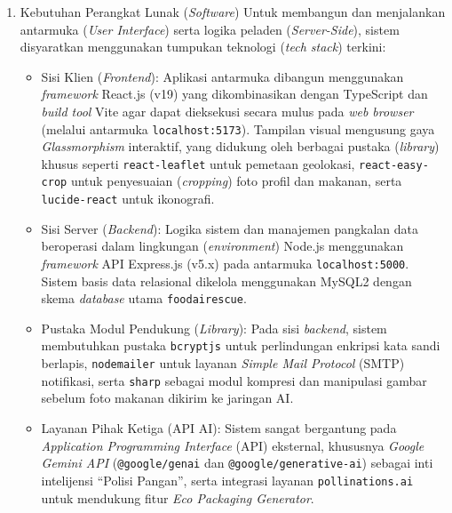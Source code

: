 \begin{enumerate}
    \item Kebutuhan Perangkat Lunak (\textit{Software})
    Untuk membangun dan menjalankan antarmuka (\textit{User Interface}) serta logika peladen (\textit{Server-Side}), sistem disyaratkan menggunakan tumpukan teknologi (\textit{tech stack}) terkini:
    \begin{itemize}
        \item Sisi Klien (\textit{Frontend}): Aplikasi antarmuka dibangun menggunakan \textit{framework} React.js (v19) yang dikombinasikan dengan TypeScript dan \textit{build tool} Vite agar dapat dieksekusi secara mulus pada \textit{web browser} (melalui antarmuka \texttt{localhost:5173}). Tampilan visual mengusung gaya \textit{Glassmorphism} interaktif, yang didukung oleh berbagai pustaka (\textit{library}) khusus seperti \texttt{react-leaflet} untuk pemetaan geolokasi, \texttt{react-easy-crop} untuk penyesuaian (\textit{cropping}) foto profil dan makanan, serta \texttt{lucide-react} untuk ikonografi.
        \item Sisi Server (\textit{Backend}): Logika sistem dan manajemen pangkalan data beroperasi dalam lingkungan (\textit{environment}) Node.js menggunakan \textit{framework} API Express.js (v5.x) pada antarmuka \texttt{localhost:5000}. Sistem basis data relasional dikelola menggunakan MySQL2 dengan skema \textit{database} utama \texttt{foodairescue}.
        \item Pustaka Modul Pendukung (\textit{Library}): Pada sisi \textit{backend}, sistem membutuhkan pustaka \texttt{bcryptjs} untuk perlindungan enkripsi kata sandi berlapis, \texttt{nodemailer} untuk layanan \textit{Simple Mail Protocol} (SMTP) notifikasi, serta \texttt{sharp} sebagai modul kompresi dan manipulasi gambar sebelum foto makanan dikirim ke jaringan AI.
        \item Layanan Pihak Ketiga (API AI): Sistem sangat bergantung pada \textit{Application Programming Interface} (API) eksternal, khususnya \textit{Google Gemini API} (\texttt{@google/genai} dan \texttt{@google/generative-ai}) sebagai inti intelijensi ``Polisi Pangan'', serta integrasi layanan \texttt{pollinations.ai} untuk mendukung fitur \textit{Eco Packaging Generator}.
    \end{itemize}


\end{enumerate}
